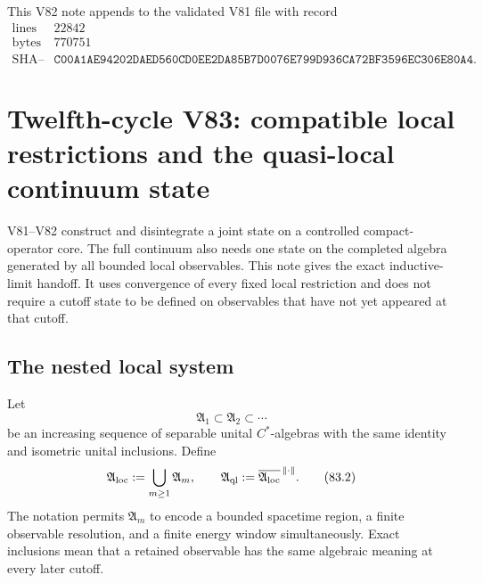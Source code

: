 \documentclass[11pt]{article}
\theoremstyle{remark}
\begin{document}
This V82 note appends to the validated V81 file with record
\[
\begin{array}{c|c}
\text{lines}&22842\\
\text{bytes}&770751\\
\text{SHA--256}&
\texttt{C00A1AE94202DAED560CD0EE2DA85B7D0076E799D936CA72BF3596EC306E80A4}.
\end{array}
\]



\section{Twelfth-cycle V83: compatible local restrictions and the
quasi-local continuum state}
\label{sec:v12v83}

V81--V82 construct and disintegrate a joint state on a controlled
compact-operator core.  The full continuum also needs one state on
the completed algebra generated by all bounded local observables.
This note gives the exact inductive-limit handoff.  It uses
convergence of every fixed local restriction and does not require a
cutoff state to be defined on observables that have not yet appeared
at that cutoff.

\subsection{The nested local system}

Let
\[
 {\mathfrak A}_1\subset{\mathfrak A}_2\subset\cdots          \tag{83.1}
\]
be an increasing sequence of separable unital \(C^*\)-algebras with
the same identity and isometric unital inclusions.  Define
\begin{equation}
 {\mathfrak A}_{\rm loc}:=\bigcup_{m\geq1}{\mathfrak A}_m,
 \qquad
 {\mathfrak A}_{\rm ql}
 :=\overline{{\mathfrak A}_{\rm loc}}^{\,\|\cdot\|}.         \tag{83.2}
\end{equation}
The notation permits \({\mathfrak A}_m\) to encode a bounded
spacetime region, a finite observable resolution, and a finite
energy window simultaneously.  Exact inclusions mean that a retained
observable has the same algebraic meaning at every later cutoff.
\end{document}
